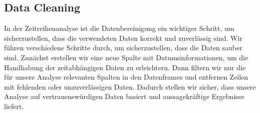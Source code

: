 \documentclass[11pt]{article}
\begin{document}
\newpage
    \hypertarget{data-cleaning}{%
\subsection{Data Cleaning}\label{data-cleaning}}

    In der Zeitreihenanalyse ist die Datenbereinigung ein wichtiger Schritt,
um sicherzustellen, dass die verwendeten Daten korrekt und zuverlässig
sind. Wir führen verschiedene Schritte durch, um sicherzustellen, dass
die Daten sauber sind. Zunächst erstellen wir eine neue Spalte mit
Datumsinformationen, um die Handhabung der zeitabhängigen Daten zu
erleichtern. Dann filtern wir nur die für unsere Analyse relevanten
Spalten in den Datenframes und entfernen Zeilen mit fehlenden oder
unzuverlässigen Daten. Dadurch stellen wir sicher, dass unsere Analyse
auf vertrauenswürdigen Daten basiert und aussagekräftige Ergebnisse
liefert.
\end{document}
